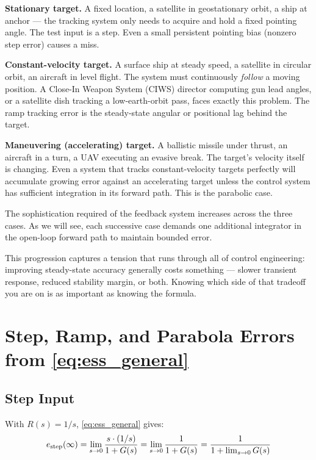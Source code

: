 \documentclass[../../book.tex]{subfiles}
\begin{document}
\textbf{Stationary target.}  A fixed location, a satellite in geostationary
orbit, a ship at anchor --- the tracking system only needs to acquire and hold a
fixed pointing angle.  The test input is a step.  Even a small persistent pointing
bias (nonzero step error) causes a miss.

\textbf{Constant-velocity target.}  A surface ship at steady speed, a satellite
in circular orbit, an aircraft in level flight.  The system must continuously
\emph{follow} a moving position.  A Close-In Weapon System (CIWS) director
computing gun lead angles, or a satellite dish tracking a low-earth-orbit pass,
faces exactly this problem.  The ramp tracking error is the steady-state angular
or positional lag behind the target.

\textbf{Maneuvering (accelerating) target.}  A ballistic missile under thrust,
an aircraft in a turn, a UAV executing an evasive break.  The target's
velocity itself is changing.  Even a system that tracks constant-velocity targets
perfectly will accumulate growing error against an accelerating target unless the
control system has sufficient integration in its forward path.  This is the
parabolic case.

The sophistication required of the feedback system increases across the three
cases.  As we will see, each successive case demands one additional integrator
in the open-loop forward path to maintain bounded error.

This progression captures a tension that runs through all of control engineering:
improving steady-state accuracy generally costs something --- slower transient
response, reduced stability margin, or both.  Knowing which side of that
tradeoff you are on is as important as knowing the formula.

\section{Step, Ramp, and Parabola Errors from \cref{eq:ess_general}}
\label{sec:three_cases}

\subsection{Step Input}

With $R(s) = 1/s$, \cref{eq:ess_general} gives:
\begin{equation}
  e_{\rm step}(\infty)
    = \lim_{s \to 0} \frac{s \cdot (1/s)}{1 + G(s)}
    = \lim_{s \to 0} \frac{1}{1 + G(s)}
    = \frac{1}{1 + \lim_{s\to 0} G(s)}
  \label{eq:ess_step}
\end{equation}
\end{document}
